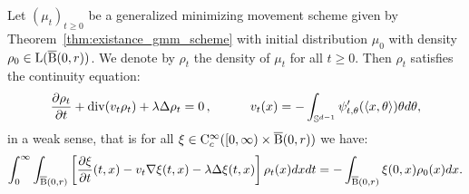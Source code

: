 \begin{thm}
Let $(\mu_t)_{t \geq 0}$ be a generalized minimizing movement scheme given by Theorem~\ref{thm:existance_gmm_scheme} with initial distribution $\mu_0$ with density $\rho_0 \in \mathrm{L}(\operatorname{\overline{B}}(0,r))$. We denote by $\rho_t$ the density of $\mu_t$ for all $t \geq 0$. Then $\rho_t$ satisfies the continuity equation:
\[
\frac{\partial \rho_t}{\partial t} + \operatorname{div}(v_t \rho_t) + \lambda \Delta \rho_t = 0 \,, \quad \quad \quad v_t(x) = - \int_{\mathbb{S}^{d-1}} \psi_{t, \theta}'(\langle x , \theta \rangle ) \theta d\theta ,
\]
in a weak sense, that is for all $\xi \in \mathrm{C}_c^{\infty} ([0, \infty)\times \operatorname{\overline{B}}(0,r))$ we have:
\[
\int_0^{\infty} \int_{\operatorname{\overline{B}}(0,r)} \left[\frac{\partial \xi}{\partial t}(t,x) - v_t \nabla \xi(t,x)  - \lambda \Delta \xi(t,x)\right] \rho_t(x) dx dt = -\int_{\operatorname{\overline{B}}(0,r)} \xi(0,x)\rho_0(x) dx.
\]
\end{thm}
